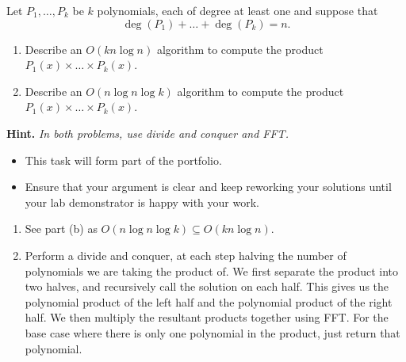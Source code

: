 \documentclass{article}
\begin{document}
\begin{question}
Let $P_1, \dots, P_k$ be $k$ polynomials, each of degree at least one and suppose that \[\deg(P_1) + \dots + \deg(P_k) = n.\]

\begin{enumerate}[label = (\alph*)]
    \item Describe an $O(kn\log n)$ algorithm to compute the product $P_1(x) \times \dots \times P_k(x)$.

    \item Describe an $O(n \log n \log k)$ algorithm to compute the product $P_1(x) \times \dots \times P_k(x)$.
\end{enumerate}

{\bfseries Hint.} {\em In both problems, use divide and conquer and FFT.}
\end{question}

\begin{rubric}
\begin{itemize}
    \item This task will form part of the portfolio.
    \item Ensure that your argument is clear and keep reworking your solutions until your lab demonstrator is happy with your work.
\end{itemize}
\end{rubric}

\begin{solution}
\begin{enumerate}[label = (\alph*)]
    \item See part (b) as $O(n\log n\log k)\subseteq O(kn\log n)$.


    \item Perform a divide and conquer, at each step halving the number of polynomials we are taking the product of. 
    We first separate the product into two halves, and recursively call the solution on each half.
    This gives us the polynomial product of the left half and the polynomial product of the right half. 
    We then multiply the resultant products together using FFT.
    For the base case where there is only one polynomial in the product, just return that polynomial.


\end{enumerate}
\end{solution}
\end{document}
